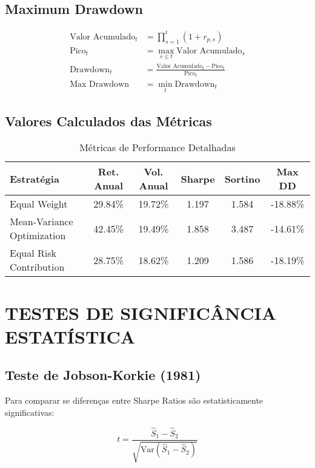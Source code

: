 \subsection{Maximum Drawdown}

\begin{align}
\text{Valor Acumulado}_t &= \prod_{s=1}^{t}(1 + r_{p,s}) \\
\text{Pico}_t &= \max_{s \leq t} \text{Valor Acumulado}_s \\
\text{Drawdown}_t &= \frac{\text{Valor Acumulado}_t - \text{Pico}_t}{\text{Pico}_t} \\
\text{Max Drawdown} &= \min_t \text{Drawdown}_t
\end{align}

\subsection{Valores Calculados das Métricas}

\begin{table}[H]
\centering
\caption{Métricas de Performance Detalhadas}
\begin{tabular}{|l|c|c|c|c|c|}
\hline
\textbf{Estratégia} & \textbf{Ret. Anual} & \textbf{Vol. Anual} & \textbf{Sharpe} & \textbf{Sortino} & \textbf{Max DD} \\
\hline
Equal Weight & 29.84\% & 19.72\% & 1.197 & 1.584 & -18.88\% \\
Mean-Variance Optimization & 42.45\% & 19.49\% & 1.858 & 3.487 & -14.61\% \\
Equal Risk Contribution & 28.75\% & 18.62\% & 1.209 & 1.586 & -18.19\% \\
\hline
\end{tabular}
\end{table}

\section{TESTES DE SIGNIFICÂNCIA ESTATÍSTICA}

\subsection{Teste de Jobson-Korkie (1981)}

Para comparar se diferenças entre Sharpe Ratios são estatisticamente significativas:

\begin{equation}
t = \frac{\hat{S}_1 - \hat{S}_2}{\sqrt{\text{Var}(\hat{S}_1 - \hat{S}_2)}}
\end{equation}

